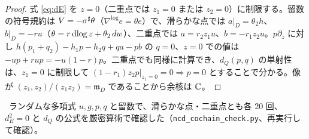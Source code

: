 \begin{proof}
式 \eqref{eq:dE} を $z=0$（二重点では $z_1=0$ または $z_2=0$）に制限する。留数の符号規約は $V=-\sigma^\sharp\theta$（$\nabla^{\log}e=\theta e$）で、滑らかな点では $a|_D=\theta_2h$、$b|_D=-ru$（$\theta=r\,\mathrm{dlog}\, z+\theta_2\,dw$）、二重点では $a=r_2z_1u$、$b=-r_1z_2u$。$p\partial_z$ に対し $h(p_1+q_2)-h_1p-h_2q+qa-pb$ の $q=0$、$z=0$ での値は $-up+rup=-u(1-r)p$。二重点でも同様に計算でき、$d_Q(p,q)$ の単射性は、$z_1=0$ に制限して $(1-r_1)z_2p|_{z_1=0}=0\Rightarrow p=0$ とすることで分かる。像が $(z_1,z_2)/(z_1z_2)=\mathfrak m_D$ であることから余核は $\mathbb C$。\qedhere
\end{proof}
\tV\ ランダムな多項式 $u,g,p,q$ と留数で、滑らかな点・二重点とも各 20 回、$d_E^2=0$ と $d_Q$ の公式を厳密算術で確認した（\texttt{ncd\_cochain\_check.py}、再実行して確認）。

